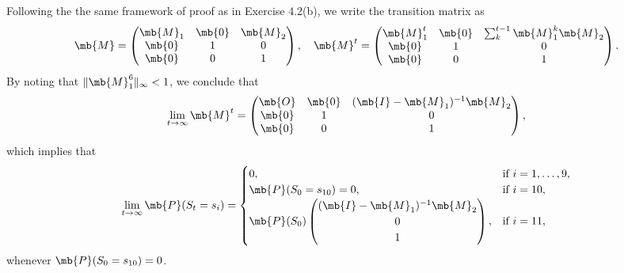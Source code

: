 \begin{exercise}
\begin{enumerate}
\begin{solution}
                Following the the same framework of proof as in Exercise 4.2(b), we write the transition matrix as
                \begin{align*}
                    \mb{M} = \begin{pmatrix}
                                 \mb{M}_1 & \mb{0} & \mb{M}_2 \\
                                 \mb{0}   & 1      & 0        \\
                                 \mb{0}   & 0      & 1
                             \end{pmatrix}, \quad
                    \mb{M}^t = \begin{pmatrix}
                                   \mb{M}_1^t & \mb{0} & \sum_{k}^{t-1}\mb{M}_1^k\mb{M}_2 \\
                                   \mb{0}     & 1      & 0                                \\
                                   \mb{0}     & 0      & 1
                               \end{pmatrix}.
                \end{align*}
                By noting that $\|\mb{M}_1^6\|_\infty < 1$, we conclude that
                \begin{align*}
                    \lim_{t\to\infty}\mb{M}^t =
                    \begin{pmatrix}
                        \mb{O} & \mb{0} & (\mb{I}-\mb{M}_1)^{-1}\mb{M}_2 \\
                        \mb{0} & 1      & 0                              \\
                        \mb{0} & 0      & 1
                    \end{pmatrix},
                \end{align*}
                which implies that
                \begin{align*}
                    \lim_{t\to\infty}\mb{P}(S_t=s_i) =
                    \begin{cases}
                        0,                                        & \text{if } i=1,\ldots,9, \\
                        \mb{P}(S_0 = s_{10}) = 0,                 & \text{if } i=10,         \\
                        \mb{P}(S_0) \begin{pmatrix}
                                        (\mb{I}-\mb{M}_1)^{-1}\mb{M}_2 \\ 0 \\  1
                                    \end{pmatrix}, & \text{if } i=11,
                    \end{cases}
                \end{align*}
                whenever $\mb{P}(S_0 = s_{10}) = 0$.
                \qedhere
            \end{solution}
    \end{enumerate}
\end{exercise}
\clearpage




